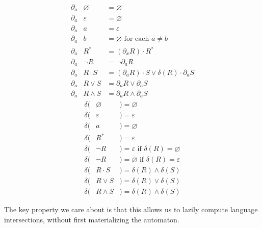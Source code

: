 \documentclass[portrait,a0b,final,a4resizeable]{a0poster}
\begin{document}
\begin{poster}
\begin{multicols}{2}
\vspace{-1cm}
\begin{multicols}{2}
\begin{eqnarray*}
\partial_a & \varnothing & = \varnothing                                           \\
\partial_a & \varepsilon & = \varnothing                                           \\
\partial_a & a           & = \varepsilon                                           \\
\partial_a & b           & = \varnothing  \text{ for each } a \neq b               \\
\partial_a & R^*         & = (\partial_x R)\cdot R^*                               \\
\partial_a & \neg R      & = \neg \partial_a R                                     \\
\partial_a & R\cdot S    & = (\partial_a R)\cdot S \vee \delta(R)\cdot\partial_a S \\
\partial_a & R\vee S     & = \partial_a R \vee \partial_a S                        \\
\partial_a & R\land S    & = \partial_a R \land \partial_a S
\end{eqnarray*} \break\vspace{-0.45cm}
\begin{eqnarray*}
\delta(& \varnothing &)= \varnothing                                      \\
\delta(& \varepsilon &)= \varepsilon                                      \\
\delta(& a           &)= \varnothing                                      \\
\delta(& R^*         &)= \varepsilon                                      \\
\delta(& \neg R      &)= \varepsilon \text{ if } \delta(R) = \varnothing  \\
\delta(& \neg R      &)= \varnothing \text{ if } \delta(R) = \varepsilon  \\
\delta(& R\cdot S    &)= \delta(R) \land \delta(S)                        \\
\delta(& R\vee S     &)= \delta(R) \vee  \delta(S)                        \\
\delta(& R\land S    &)= \delta(R) \land \delta(S)
\end{eqnarray*}
\end{multicols}

    \hspace*{2cm}\begin{minipage}[c]{0.90\columnwidth}
    The key property we care about is that this allows us to lazily compute language intersections, without first materializing the automaton.
    \end{minipage}


\end{multicols}
\end{poster}
\end{document}
